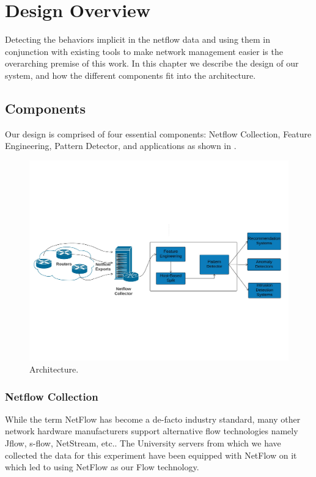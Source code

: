 
\chapter{Design Overview}

Detecting the behaviors implicit in the netflow data and
using them in conjunction with existing tools to make network management easier is the overarching premise of this work. In this chapter we describe the design of our system, and how the
different components fit into the architecture.

\section{Components}
Our design is comprised of four essential components: Netflow Collection, Feature Engineering, Pattern Detector, and
applications as shown in .
\begin{figure}[t]
	\centerline{\includegraphics[trim=4cm 4cm 4cm 4cm, scale = 0.6]{architecture.pdf}}
	\caption{Architecture.}%
\end{figure}

\subsection{Netflow Collection}
While the term NetFlow has become a de-facto industry standard, many other network hardware manufacturers support alternative flow technologies namely Jflow, s-flow, NetStream, etc.. The University servers from which we have collected the data for this experiment have been equipped with NetFlow on it which led to using NetFlow as our Flow technology. 
